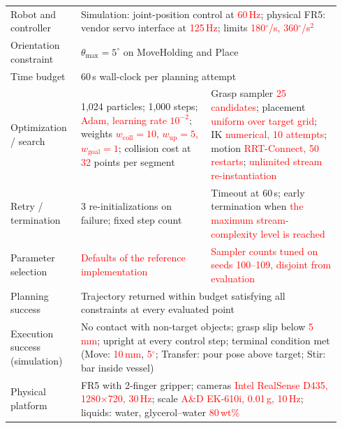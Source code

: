 \documentclass{ieeeaccess}
\newcommand{\nd}[1]{\textcolor{red}{#1}}
\begin{document}
\begin{table}[!t]
{\begin{tabular*}{\linewidth}{@{\extracolsep{\fill}}p{0.2\linewidth}p{0.37\linewidth}p{0.37\linewidth}@{}}
Robot and controller & \multicolumn{2}{p{\dimexpr0.74\linewidth+2\tabcolsep\relax}}{Simulation: joint-position control at \nd{60\,Hz}; physical FR5: vendor servo interface at \nd{125\,Hz}; limits \nd{180$^\circ$/s, 360$^\circ$/s$^2$}} \\
Orientation constraint & \multicolumn{2}{p{\dimexpr0.74\linewidth+2\tabcolsep\relax}}{$\theta_{\max}=5^\circ$ on MoveHolding and Place} \\
Time budget & \multicolumn{2}{p{\dimexpr0.74\linewidth+2\tabcolsep\relax}}{60\,s wall-clock per planning attempt} \\
Optimization / search & 1,024 particles; 1,000 steps; \nd{Adam, learning rate $10^{-2}$}; weights \nd{$w_{\mathrm{coll}}=10$, $w_{\mathrm{up}}=5$, $w_{\mathrm{goal}}=1$}; collision cost at \nd{32} points per segment & Grasp sampler \nd{25 candidates}; placement \nd{uniform over target grid}; IK \nd{numerical, 10 attempts}; motion \nd{RRT-Connect, 50 restarts}; \nd{unlimited stream re-instantiation} \\
Retry / termination & 3 re-initializations on failure; fixed step count & Timeout at 60\,s; early termination when \nd{the maximum stream-complexity level is reached} \\
Parameter selection & \nd{Defaults of the reference implementation} & \nd{Sampler counts tuned on seeds 100--109, disjoint from evaluation} \\
Planning success & \multicolumn{2}{p{\dimexpr0.74\linewidth+2\tabcolsep\relax}}{Trajectory returned within budget satisfying all constraints at every evaluated point} \\
Execution success (simulation) & \multicolumn{2}{p{\dimexpr0.74\linewidth+2\tabcolsep\relax}}{No contact with non-target objects; grasp slip below \nd{5\,mm}; upright at every control step; terminal condition met (Move: \nd{10\,mm}, \nd{5$^\circ$}; Transfer: pour pose above target; Stir: bar inside vessel)} \\
Physical platform & \multicolumn{2}{p{\dimexpr0.74\linewidth+2\tabcolsep\relax}}{FR5 with 2-finger gripper; cameras \nd{Intel RealSense D435, 1280$\times$720, 30\,Hz}; scale \nd{A\&D EK-610i, 0.01\,g, 10\,Hz}; liquids: water, glycerol--water \nd{80\,wt\%}} \\
\bottomrule
\end{tabular*}}
\end{table}
\end{document}

